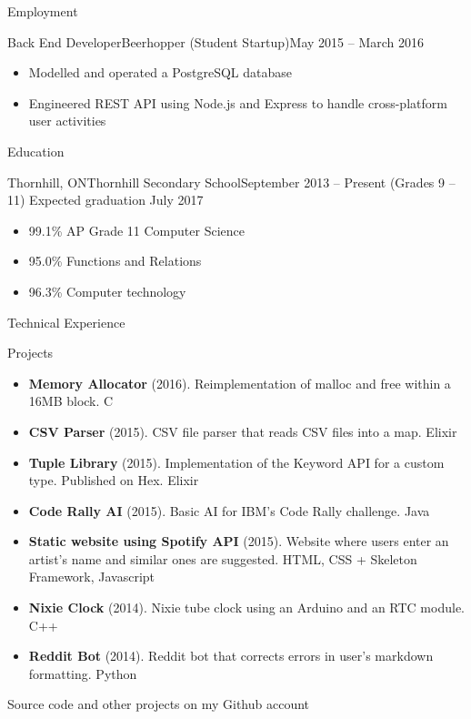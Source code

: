 \documentclass[]{mcdowellcv}
\begin{document}
	\makeheader

	\begin{cvsection}{Employment}
		\begin{cvsubsection}{Back End Developer}{Beerhopper (Student Startup)}{May 2015 -- March 2016}
			\begin{itemize}
				\item Modelled and operated a PostgreSQL database
				\item Engineered REST API using Node.js and Express to handle cross-platform user activities
			\end{itemize}
		\end{cvsubsection}
	\end{cvsection}

	\begin{cvsection}{Education}
		\begin{cvsubsection}{Thornhill, ON}{Thornhill Secondary School}{September 2013 -- Present (Grades 9 -- 11)}
            Expected graduation July 2017
			\begin{itemize}
				\item 99.1\% AP Grade 11 Computer Science
				\item 95.0\% Functions and Relations
				\item 96.3\% Computer technology
			\end{itemize}
		\end{cvsubsection}
	\end{cvsection}

	\begin{cvsection}{Technical Experience}
		\begin{cvsubsection}{Projects}{}{}
			\begin{itemize}
				\item \textbf{Memory Allocator} (2016). Reimplementation of malloc and free within a 16MB block.  C
				\item \textbf{CSV Parser} (2015). CSV file parser that reads CSV files into a map.  Elixir
				\item \textbf{Tuple Library} (2015). Implementation of the Keyword API for a custom type. Published on Hex.  Elixir
				\item \textbf{Code Rally AI} (2015). Basic AI for IBM's Code Rally challenge.  Java
				\item \textbf{Static website using Spotify API} (2015). Website where users enter an artist's name and similar ones are suggested.  HTML, CSS + Skeleton Framework, Javascript
				\item \textbf{Nixie Clock} (2014). Nixie tube clock using an Arduino and an RTC module.  C++
				\item \textbf{Reddit Bot} (2014). Reddit bot that corrects errors in user's markdown formatting.  Python
			\end{itemize}
            Source code and other projects on my Github account
		\end{cvsubsection}
	\end{cvsection}
\end{document}
